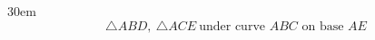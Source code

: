 \documentclass[border=4pt]{standalone}
\begin{document}
\begin{varwidth}{30em}
\large
\[ \triangle ABD,\ \triangle ACE \ \text{under curve } ABC \text{ on base } AE \]

\end{varwidth}
\end{document}
